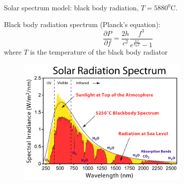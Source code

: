 \documentclass{beamer}
\begin{document}
\begin{frame}{Solar spectrum model: black body radiation, $T=5880^{0}$C.}

Black body radiation spectrum (Planck's equation):
$$ \frac{\partial P}{\partial f} = \frac{2h}{c^2}\frac{f^3}{e^{\frac{hf}{k_{B}T}}-1}$$
where $T$ is the temperature of the black body radiator
\begin{figure} [t]
\includegraphics[width=0.75\textwidth]{figures/figure1_Solar_Spectrum.png}
\end{figure}

\end{frame}
\end{document}

